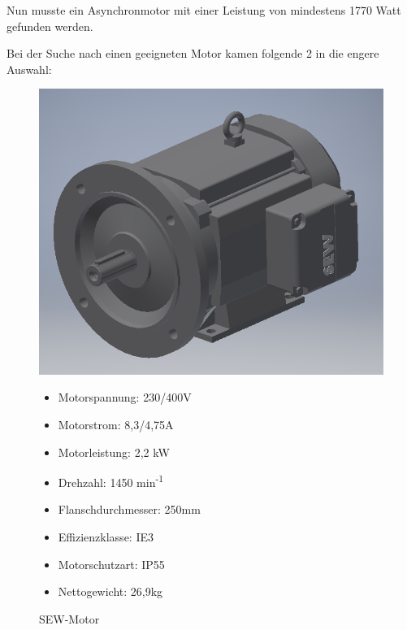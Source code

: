 Nun musste ein Asynchronmotor mit einer Leistung von mindestens 1770 Watt gefunden werden.


Bei der Suche nach einen geeigneten Motor kamen folgende 2 in die engere Auswahl:

\begin{figure}[!ht]
\begin{minipage}[t]{0.45\textwidth}
\includegraphics[width=\textwidth]{SEWMotor}
\caption{SEW-Motor}

\begin{itemize}
	\item{Motorspannung: 230/400V}
	\item{Motorstrom: 8,3/4,75A}
	\item{Motorleistung: 2,2 kW}
	\item{Drehzahl: 1450 min\textsuperscript{-1}}
	\item{Flanschdurchmesser: 250mm}
	\item{Effizienzklasse: IE3}
	\item{Motorschutzart: IP55}
	\item{Nettogewicht: 26,9kg}
\end{itemize}

\end{minipage}
\hspace{0.1\textwidth}
\begin{minipage}[t]{0.45\textwidth}


\end{minipage}
\end{figure}
